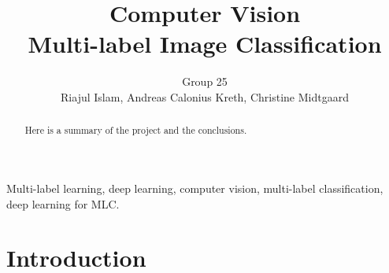 \documentclass[lettersize,journal]{IEEEtran}
\begin{document}
\title{Computer Vision\\ \vspace{.5em} 
\Large Multi-label Image Classification}
\author{Group 25 \\ \vspace{.2em} Riajul Islam, Andreas Calonius Kreth, Christine Midtgaard}



\maketitle







\begin{abstract}
Here is a summary of the project and the conclusions.
\end{abstract}

\begin{IEEEkeywords}
Multi-label learning, deep learning, computer vision, multi-label
classification, deep learning for MLC. 

\end{IEEEkeywords}


\section{Introduction}




\end{document}
